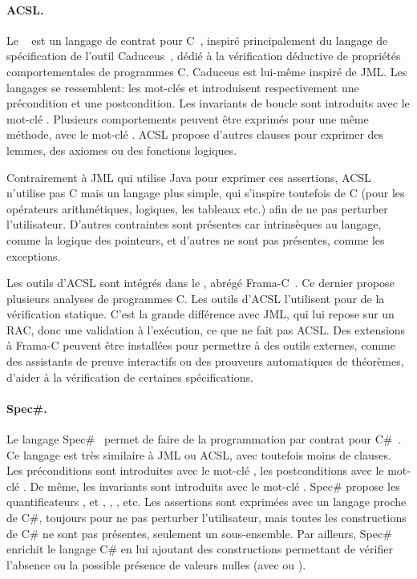 \paragraph{ACSL.} Le ~
est un langage de contrat pour C~, inspiré principalement du langage de
spécification de l'outil Caduceus~, dédié à la vérification
déductive de propriétés comportementales de programmes C. Caduceus est lui-même
inspiré de JML. Les langages se ressemblent: les mot-clés  et
 introduisent respectivement une précondition et une
postcondition. Les invariants de boucle sont introduits avec le mot-clé
. Plusieurs comportements peuvent être exprimés pour une même
méthode, avec le mot-clé . ACSL propose d'autres clauses pour
exprimer des lemmes, des axiomes ou des fonctions logiques.

Contrairement à JML qui utilise Java pour exprimer ces assertions, ACSL
n'utilise pas C mais un langage plus simple, qui s'inspire toutefois de C (pour
les opérateurs arithmétiques, logiques, les tableaux etc.) afin de ne pas
perturber l'utilisateur. D'autres contraintes sont présentes car intrinsèques au
langage, comme la logique des pointeurs, et d'autres ne sont pas présentes,
comme les exceptions.

Les outils d'ACSL sont intégrés dans le , abrégé Frama-C~. Ce dernier propose
plusieurs analyses de programmes C. Les outils d'ACSL l'utilisent pour de la
vérification statique. C'est la grande différence avec JML, qui lui repose sur
un RAC, donc une validation à l'exécution, ce que ne fait pas ACSL. Des
extensions à Frama-C peuvent être installées pour permettre à des outils
externes, comme des assistants de preuve interactifs ou des prouveurs
automatiques de théorèmes, d'aider à la vérification de certaines
spécifications.

\paragraph{Spec\#.} Le langage Spec\#~ permet de faire de la
programmation par contrat pour C\#~. Ce langage est très similaire
à JML ou ACSL, avec toutefois moins de clauses. Les préconditions sont
introduites avec le mot-clé , les postconditions avec le mot-clé
.  De même, les invariants sont introduits avec le mot-clé
. Spec\# propose les quantificateurs ,
 et , , , 
etc. Les assertions sont exprimées avec un langage proche de C\#, toujours pour
ne pas perturber l'utilisateur, mais toutes les constructions de C\# ne sont pas
présentes, seulement un sous-ensemble. Par ailleurs, Spec\# enrichit le langage
C\# en lui ajoutant des constructions permettant de vérifier l'absence ou la
possible présence de valeurs nulles (avec \code{!} ou ).

